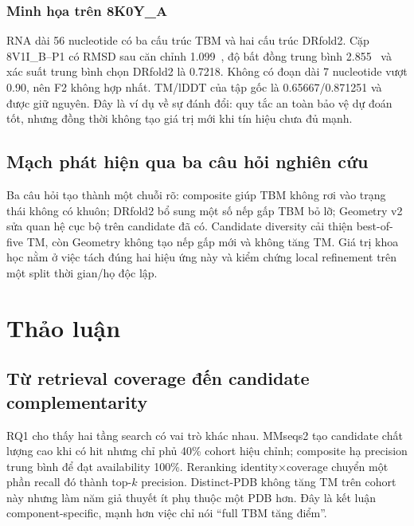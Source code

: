 \documentclass[12pt,a4paper,oneside]{report}
\newcommand{\angstrom}{\text{\AA}}
\begin{document}
\subsection{Minh họa trên 8K0Y\_A}

RNA dài 56 nucleotide có ba cấu trúc TBM và hai cấu trúc DRfold2. Cặp 8V1I\_B--P1 có
RMSD sau căn chỉnh 1.099~\angstrom, độ bất đồng trung bình 2.855~\angstrom{} và xác suất
trung bình chọn DRfold2 là 0.7218. Không có đoạn dài 7 nucleotide vượt 0.90, nên F2
không hợp nhất. TM/lDDT của tập gốc là 0.65667/0.871251 và được giữ nguyên. Đây là ví
dụ về sự đánh đổi: quy tắc an toàn bảo vệ dự đoán tốt, nhưng đồng thời không tạo giá trị
mới khi tín hiệu chưa đủ mạnh.

\fi

\section{Mạch phát hiện qua ba câu hỏi nghiên cứu}

Ba câu hỏi tạo thành một chuỗi rõ: composite giúp TBM không rơi vào trạng thái không có
khuôn; DRfold2 bổ sung một số nếp gấp TBM bỏ lỡ; Geometry v2 sửa quan hệ cục bộ trên
candidate đã có. Candidate diversity cải thiện best-of-five TM, còn Geometry không tạo
nếp gấp mới và không tăng TM. Giá trị khoa học nằm ở việc tách đúng hai hiệu ứng này và
kiểm chứng local refinement trên một split thời gian/họ độc lập.

\chapter{Thảo luận}

\section{Từ retrieval coverage đến candidate complementarity}

RQ1 cho thấy hai tầng search có vai trò khác nhau. MMseqs2 tạo candidate chất lượng cao
khi có hit nhưng chỉ phủ 40\% cohort hiệu chỉnh; composite hạ precision trung bình để
đạt availability 100\%. Reranking identity$\times$coverage chuyển một phần recall đó
thành top-$k$ precision. Distinct-PDB không tăng TM trên cohort này nhưng làm năm giả
thuyết ít phụ thuộc một PDB hơn. Đây là kết luận component-specific, mạnh hơn việc chỉ
nói ``full TBM tăng điểm''.
\end{document}
